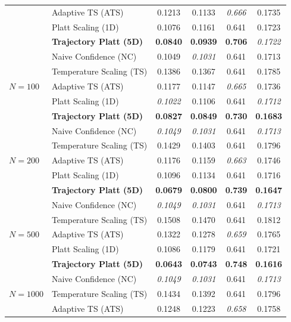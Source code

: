 \begin{table}[t]
\begin{tabular}{llcccc}
 & Adaptive TS (ATS) & 0.1213 & 0.1133 & \textit{0.666} & 0.1735 \\
 & Platt Scaling (1D) & 0.1076 & 0.1161 & 0.641 & 0.1723 \\
 & \textbf{Trajectory Platt (5D)} & \textbf{0.0840} & \textbf{0.0939} & \textbf{0.706} & \textit{0.1722} \\
\midrule
\multirow{5}{*}{$N = 100$} & Naive Confidence (NC) & 0.1049 & \textit{0.1031} & 0.641 & 0.1713 \\
 & Temperature Scaling (TS) & 0.1386 & 0.1367 & 0.641 & 0.1785 \\
 & Adaptive TS (ATS) & 0.1177 & 0.1147 & \textit{0.665} & 0.1736 \\
 & Platt Scaling (1D) & \textit{0.1022} & 0.1106 & 0.641 & \textit{0.1712} \\
 & \textbf{Trajectory Platt (5D)} & \textbf{0.0827} & \textbf{0.0849} & \textbf{0.730} & \textbf{0.1683} \\
\midrule
\multirow{5}{*}{$N = 200$} & Naive Confidence (NC) & \textit{0.1049} & \textit{0.1031} & 0.641 & \textit{0.1713} \\
 & Temperature Scaling (TS) & 0.1429 & 0.1403 & 0.641 & 0.1796 \\
 & Adaptive TS (ATS) & 0.1176 & 0.1159 & \textit{0.663} & 0.1746 \\
 & Platt Scaling (1D) & 0.1096 & 0.1134 & 0.641 & 0.1716 \\
 & \textbf{Trajectory Platt (5D)} & \textbf{0.0679} & \textbf{0.0800} & \textbf{0.739} & \textbf{0.1647} \\
\midrule
\multirow{5}{*}{$N = 500$} & Naive Confidence (NC) & \textit{0.1049} & \textit{0.1031} & 0.641 & \textit{0.1713} \\
 & Temperature Scaling (TS) & 0.1508 & 0.1470 & 0.641 & 0.1812 \\
 & Adaptive TS (ATS) & 0.1322 & 0.1278 & \textit{0.659} & 0.1765 \\
 & Platt Scaling (1D) & 0.1086 & 0.1179 & 0.641 & 0.1721 \\
 & \textbf{Trajectory Platt (5D)} & \textbf{0.0643} & \textbf{0.0743} & \textbf{0.748} & \textbf{0.1616} \\
\midrule
\multirow{5}{*}{$N = 1000$} & Naive Confidence (NC) & \textit{0.1049} & \textit{0.1031} & 0.641 & \textit{0.1713} \\
 & Temperature Scaling (TS) & 0.1434 & 0.1392 & 0.641 & 0.1796 \\
 & Adaptive TS (ATS) & 0.1248 & 0.1223 & \textit{0.658} & 0.1758 \\

\end{tabular}
\end{table}
